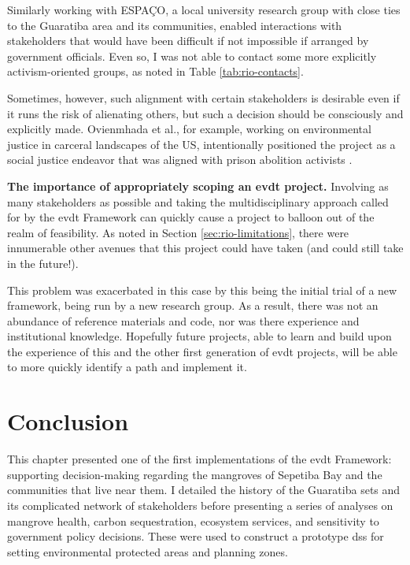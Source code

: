 Similarly working with ESPAÇO, a local university research group with close ties to the Guaratiba area and its communities, enabled interactions with stakeholders that would have been difficult if not impossible if arranged by government officials. Even so, I was not able to contact some more explicitly activism-oriented groups, as noted in Table \ref{tab:rio-contacts}.

Sometimes, however, such alignment with certain stakeholders is desirable even if it runs the risk of alienating others, but such a decision should be consciously and explicitly made. Ovienmhada et al., for example, working on environmental justice in carceral landscapes of the US, intentionally positioned the project as a social justice endeavor that was aligned with prison abolition activists \cite{ovienmhadaEnvironmentVulnerabilityDecisionTechnologyModelingFramework2021}. 

\textbf{The importance of appropriately scoping an \ac{evdt} project.} Involving as many stakeholders as possible and taking the multidisciplinary approach called for by the \ac{evdt} Framework can quickly cause a project to balloon out of the realm of feasibility. As noted in Section \ref{sec:rio-limitations}, there were innumerable other avenues that this project could have taken (and could still take in the future!). 

This problem was exacerbated in this case by this being the initial trial of a new framework, being run by a new research group. As a result, there was not an abundance of reference materials and code, nor was there experience and institutional knowledge. Hopefully future projects, able to learn and build upon the experience of this and the other first generation of \ac{evdt} projects, will be able to more quickly identify a path and implement it.


\section{Conclusion}

This chapter presented one of the first implementations of the \ac{evdt} Framework: supporting decision-making regarding the mangroves of Sepetiba Bay and the communities that live near them. I detailed the history of the Guaratiba \acl{sets} and its complicated network of stakeholders before presenting a series of analyses on mangrove health, carbon sequestration, ecosystem services, and sensitivity to government policy decisions. These were used to construct a prototype \ac{dss} for setting environmental protected areas and planning zones. 

